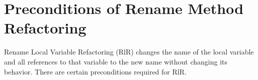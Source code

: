 \documentclass[10pt,conference]{IEEEtran}
\begin{document}
\label{sec:precon1}
	
\label{sec:precon2}

\label{sec:precon3}

 





\section{\textbf{Preconditions of Rename Method Refactoring}}




Rename Local Variable Refactoring (RlR) changes the name of the local variable and all references to that variable to the new name without changing its behavior. There are certain preconditions required for RlR.




%
%
\end{document}
